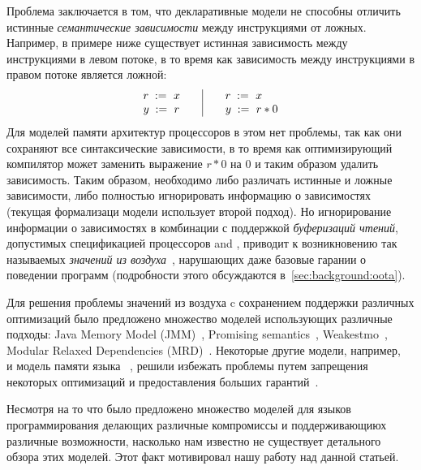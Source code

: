 Проблема заключается в том, что декларативные модели не способны 
отличить истинные \emph{семантические зависимости} между инструкциями от ложных.
Например, в примере ниже существует истинная зависимость между 
инструкциями в левом потоке, в то время как зависимость между 
инструкциями в правом потоке является ложной:
\[\begin{array}{l@{\qquad}|@{\qquad}l}
\readInst{}{r}{x} & \readInst{}{r}{x} \\
\writeInst{}{y}{r} & \readInst{}{y}{r * 0} \\
\end{array}\]
Для моделей памяти архитектур процессоров в этом нет проблемы, 
так как они сохраняют все синтаксические зависимости, 
в то время как оптимизирующий компилятор может заменить выражение 
$r * 0$ на $0$ и таким образом удалить зависимость. 
Таким образом, необходимо либо различать истинные и ложные зависимости, 
либо полностью игнорировать информацию о зависимостях 
(текущая формализаци модели \CPP использует второй подход).
Но игнорирование информации о зависимостях в комбинации с 
поддержкой \emph{буферизаций чтений}, допустимых 
спецификацией процессоров \ARM and \POWER, 
приводит к возникновению так называемых 
\emph{значений из воздуха}~\cite{Boehm-Demsky:MSPC14}, 
нарушающих даже базовые гарании о поведении программ
(подробности этого обсуждаются в~\cref{sec:background:oota}).

Для решения проблемы значений из воздуха c сохранением
поддержки различных оптимизаций было предложено 
множество моделей использующих различные подходы:
Java Memory Model (JMM)~\cite{Manson-al:POPL05}, Promising semantics~\cite{Kang-al:POPL17,Lee-al:PLDI20},
Weakestmo~\cite{Chakraborty-Vafeiadis:POPL19}, Modular Relaxed Dependencies (MRD)~\cite{Paviotti-al:ESOP20}.
Некоторые другие модели, например, \RCMM~\cite{Lahav-al:PLDI17} и модель памяти языка \OCaml~\cite{Dolan-al:PLDI18},
решили избежать проблемы путем запрещения некоторых оптимизаций и предоставления больших гарантий~\cite{Ou-Demsky:OOPSLA18}.

Несмотря на то что было предложено множество моделей для языков программирования
делающих различные компромиссы и поддерживающиюх различные возможности, 
насколько нам известно не существует детального обзора этих моделей. 
Этот факт мотивировал нашу работу над данной статьей.

